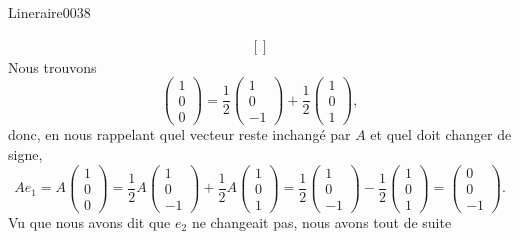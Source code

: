 \begin{corrige}{Lineraire0038}
\begin{enumerate}
\begin{equation}
\begin{aligned}[]
		\end{aligned}
	\end{equation}
	Nous trouvons
	\begin{equation}
		\begin{pmatrix}
			1	\\ 
			0	\\ 
			0	
		\end{pmatrix}=\frac{1}{ 2 }\begin{pmatrix}
			1	\\ 
			0	\\ 
			-1	
		\end{pmatrix}+\frac{ 1 }{2}\begin{pmatrix}
			1	\\ 
			0	\\ 
			1	
		\end{pmatrix},
	\end{equation}
	donc, en nous rappelant quel vecteur reste inchangé par $A$ et quel doit changer de signe,
	\begin{equation}
		Ae_1=A\begin{pmatrix}
			1	\\ 
			0	\\ 
			0	
		\end{pmatrix}=
		\frac{1}{ 2 }A\begin{pmatrix}
			1	\\ 
			0	\\ 
			-1	
		\end{pmatrix}+\frac{ 1 }{2}A\begin{pmatrix}
			1	\\ 
			0	\\ 
			1	
		\end{pmatrix}=
		\frac{1}{ 2 }\begin{pmatrix}
			1	\\ 
			0	\\ 
			-1	
		\end{pmatrix}-\frac{ 1 }{2}\begin{pmatrix}
			1	\\ 
			0	\\ 
			1	
		\end{pmatrix}=
		\begin{pmatrix}
			0	\\ 
			0	\\ 
			-1	
		\end{pmatrix}.
	\end{equation}
	Vu que nous avons dit que $e_2$ ne changeait pas, nous avons tout de suite
	\begin{equation}

\end{equation}
\end{enumerate}
\end{corrige}
